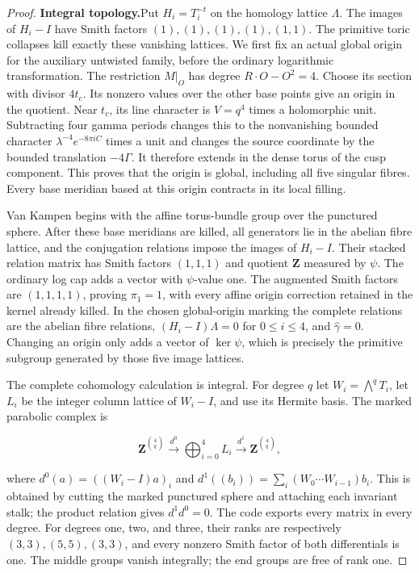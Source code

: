 \begin{proof}
\par\medskip\noindent\textbf{Integral topology.}\enspace Put \(H_i=T_i^{-t}\) on the
homology lattice \(\Lambda\).  The images of \(H_i-I\) have
Smith factors \((1),(1),(1),(1),(1,1)\).  The primitive toric
collapses kill exactly these vanishing lattices.  We first fix
an actual global origin for the auxiliary untwisted family, before
the ordinary logarithmic transformation.  The restriction
\(M|_O\) has degree \(R\cdot O-O^2=4\).  Choose its section
with divisor \(4t_c\).  Its nonzero values over the other base
points give an origin in the quotient.  Near \(t_c\), its line
character is \(V=q^4\) times a holomorphic unit.  Subtracting
four gamma periods changes this to the nonvanishing bounded
character \(\lambda^{-4}e^{-8\pi iC}\) times a unit and changes
the source coordinate by the bounded translation \(-4\Gamma\).
It therefore extends in the dense torus of the cusp component.
This proves that the origin is global, including all five singular
fibres.  Every base meridian based at this origin contracts in
its local filling.

Van Kampen begins with the affine torus-bundle group over the
punctured sphere.  After these base meridians are killed, all
generators lie in the abelian fibre lattice, and the conjugation
relations impose the images of \(H_i-I\).  Their stacked relation
matrix has Smith factors \((1,1,1)\) and quotient \(\mathbf Z\)
measured by \(\psi\).  The ordinary log cap adds a vector with
\(\psi\)-value one.  The augmented Smith factors are
\((1,1,1,1)\), proving \(\pi_1=1\), with every affine origin
correction retained in the kernel already killed.  In the chosen
global-origin marking the complete relations are the abelian
fibre relations, \((H_i-I)\Lambda=0\) for \(0\leq i\leq4\),
and \(\widehat\gamma=0\).  Changing an origin only adds a vector
of \(\ker\psi\), which is precisely the primitive subgroup
generated by those five image lattices.

The complete cohomology calculation is integral.  For degree \(q\)
let \(W_i=\bigwedge^qT_i\), let \(L_i\) be the integer column
lattice of \(W_i-I\), and use its Hermite basis.  The marked
parabolic complex is

\[
 \mathbf Z^{\binom4q}\xrightarrow{d^0}
 \bigoplus_{i=0}^4 L_i\xrightarrow{d^1}
 \mathbf Z^{\binom4q},
\]

where \(d^0(a)=((W_i-I)a)_i\) and
\(d^1((b_i))=\sum_i(W_0\cdots W_{i-1})b_i\).
This is obtained by cutting the marked punctured sphere and
attaching each invariant stalk; the product relation gives
\(d^1d^0=0\).  The code exports every matrix in every degree.
For degrees one, two, and three, their ranks are respectively
\((3,3),(5,5),(3,3)\), and every nonzero Smith factor of
both differentials is one.  The middle groups vanish integrally;
the end groups are free of rank one.


\end{proof}
